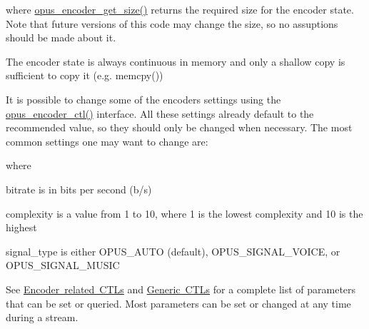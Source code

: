 where \mbox{\hyperlink{group__opus__encoder_ga9ac72d062eca0c77711f5b04b9dcc645}{opus\+\_\+encoder\+\_\+get\+\_\+size()}} returns the required size for the encoder state. Note that future versions of this code may change the size, so no assuptions should be made about it.

The encoder state is always continuous in memory and only a shallow copy is sufficient to copy it (e.\+g. memcpy())

It is possible to change some of the encoder\textquotesingle{}s settings using the \mbox{\hyperlink{group__opus__encoder_ga88cb327d8f7d6a96c7d2d0b8461512e6}{opus\+\_\+encoder\+\_\+ctl()}} interface. All these settings already default to the recommended value, so they should only be changed when necessary. The most common settings one may want to change are\+:


\begin{DoxyCode}{0}
\end{DoxyCode}


where

\begin{DoxyItemize}
\item bitrate is in bits per second (b/s) \item complexity is a value from 1 to 10, where 1 is the lowest complexity and 10 is the highest \item signal\+\_\+type is either O\+P\+U\+S\+\_\+\+A\+U\+TO (default), O\+P\+U\+S\+\_\+\+S\+I\+G\+N\+A\+L\+\_\+\+V\+O\+I\+CE, or O\+P\+U\+S\+\_\+\+S\+I\+G\+N\+A\+L\+\_\+\+M\+U\+S\+IC\end{DoxyItemize}
See \mbox{\hyperlink{group__opus__encoderctls}{Encoder related C\+T\+Ls}} and \mbox{\hyperlink{group__opus__genericctls}{Generic C\+T\+Ls}} for a complete list of parameters that can be set or queried. Most parameters can be set or changed at any time during a stream.

